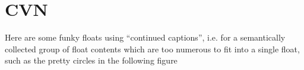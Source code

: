 \chapter{CVN}
\label{chap:cvn}

Here are some funky floats using ``continued captions'', i.e. for a semantically
collected group of float contents which are too numerous to fit into a single
float, such as the pretty circles in the following figure